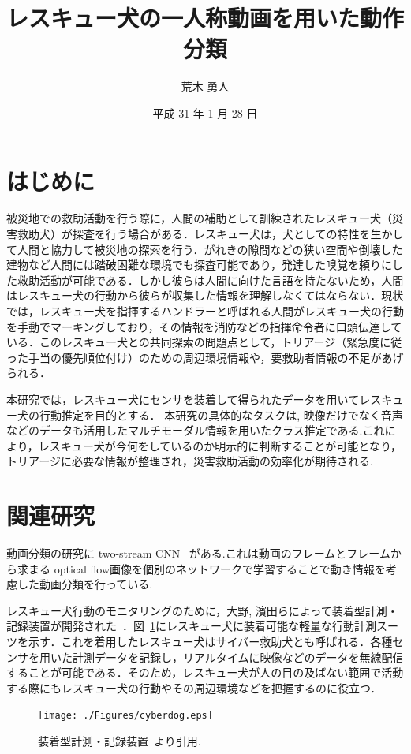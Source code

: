 \documentclass[twocolumn, a4paper]{UECIEresume}
\title{レスキュー犬の一人称動画を用いた動作分類}
\date{平成 31 年 1 月 28 日}
\affiliation{情報学専攻 メディア情報学 プログラム}
\author{荒木 勇人}
\renewcommand{\baselinestretch}{0.73}
\begin{document}
\maketitle

\section{はじめに}
被災地での救助活動を行う際に，人間の補助として訓練されたレスキュー犬（災害救助犬）が探査を行う場合がある．レスキュー犬は，犬としての特性を生かして人間と協力して被災地の探索を行う．がれきの隙間などの狭い空間や倒壊した建物など人間には踏破困難な環境でも探査可能であり，発達した嗅覚を頼りにした救助活動が可能である．しかし彼らは人間に向けた言語を持たないため，人間はレスキュー犬の行動から彼らが収集した情報を理解しなくてはならない．現状では，レスキュー犬を指揮するハンドラーと呼ばれる人間がレスキュー犬の行動を手動でマーキングしており，その情報を消防などの指揮命令者に口頭伝達している．このレスキュー犬との共同探索の問題点として，トリアージ（緊急度に従った手当の優先順位付け）のための周辺環境情報や，要救助者情報の不足があげられる．

本研究では，レスキュー犬にセンサを装着して得られたデータを用いてレスキュー犬の行動推定を目的とする．
本研究の具体的なタスクは, 映像だけでなく音声などのデータも活用したマルチモーダル情報を用いたクラス推定である.これにより，レスキュー犬が今何をしているのか明示的に判断することが可能となり，トリアージに必要な情報が整理され，災害救助活動の効率化が期待される.

\section{関連研究}
動画分類の研究に two-stream CNN ~\cite{simonyan2014two}がある.これは動画のフレームとフレームから求まる optical flow画像を個別のネットワークで学習することで動き情報を考慮した動画分類を行っている.

レスキュー犬行動のモニタリングのために，大野, 濱田らによって装着型計測・記録装置が開発された~\cite{dog01}．図~\ref{cyber}にレスキュー犬に装着可能な軽量な行動計測スーツを示す．これを着用したレスキュー犬はサイバー救助犬とも呼ばれる．各種センサを用いた計測データを記録し，リアルタイムに映像などのデータを無線配信することが可能である．そのため，レスキュー犬が人の目の及ばない範囲で活動する際にもレスキュー犬の行動やその周辺環境などを把握するのに役立つ．

\begin{figure}[htbp]
 \begin{center}
  \texttt{[image: ./Figures/cyberdog.eps]}
  \caption{装着型計測・記録装置~\cite{dog01}より引用.}
  \label{cyber}
 \end{center}
\end{figure}
\end{document}
